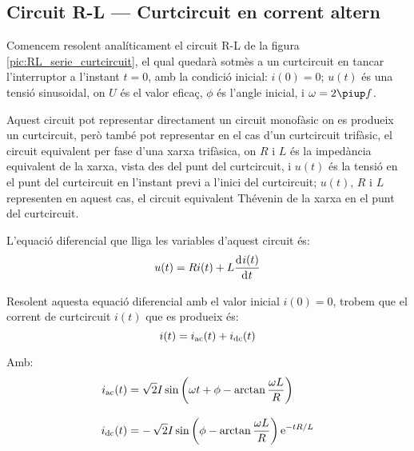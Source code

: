 \subsection {Circuit R-L --- Curtcircuit en corrent altern}\label{sec:ccRL}

Comencem resolent analíticament el circuit R-L de la figura \vref{pic:RL_serie_curtcircuit}, el qual quedarà sotmès a un curtcircuit en tancar l'interruptor a l'instant $t=0$, amb la condició inicial: $i(0) = 0$; $u(t)$ és una tensió sinusoidal, on $U$ és el valor eficaç, $\phi$ és l'angle inicial, i $\omega = 2 \piup f$.

Aquest circuit pot representar directament un circuit monofàsic on es produeix un curtcircuit, però també pot representar en el cas d'un curtcircuit trifàsic,  el circuit equivalent per fase d'una xarxa trifàsica, on $R$ i $L$ és la impedància equivalent de la xarxa, vista des del punt del curtcircuit, i $u(t)$ és la tensió en el punt del curtcircuit en l'instant previ a l'inici del curtcircuit; $u(t)$,  $R$ i $L$ representen en aquest cas, el circuit equivalent Thévenin de la xarxa en el punt del curtcircuit.

\begin{center}
    
    \label{pic:RL_serie_curtcircuit}
\end{center}

L'equació diferencial que lliga les variables d'aquest circuit és:
\begin{equation}
    u(t) = R i(t) + L \deriv{i(t)}{t}
\end{equation}

Resolent aquesta equació diferencial amb el valor inicial $i(0)=0$, trobem que el corrent de curtcircuit $i(t)$  que es produeix  és:
\begin{equation}
    i(t) = i_\mathrm{ac}(t) + i_\mathrm{dc}(t)
    \label{eq:RL_serie_curtcircuit_icc}
\end{equation}

Amb:
\begin{subequations}
\begin{align}
    i_\mathrm{ac}(t) &= \sqrt{2} I \sin\left(\omega t + \phi - \arctan\frac{\omega L}{R}\right) \label{eq:RL_serie_curtcircuit_iac}\\[3mm]
    i_\mathrm{dc}(t) &= -\,\sqrt{2} I\sin\left(\phi - \arctan\frac{\omega L}{R}\right) \mathrm{e}^{-t R/L}\label{eq:RL_serie_curtcircuit_idc}
\end{align}
\end{subequations}

